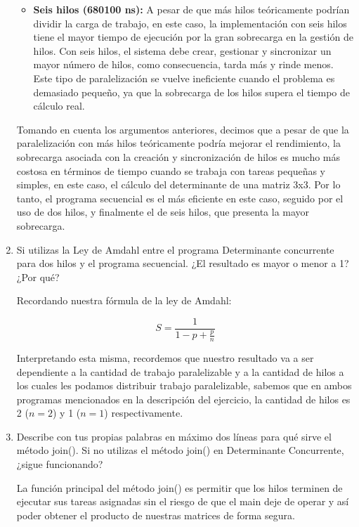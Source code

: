 \begin{enumerate}
\begin{itemize}
        \item \textbf{Seis hilos (680100 ns):} A pesar de que más hilos teóricamente podrían dividir la carga de trabajo, en este caso, la implementación con seis           hilos tiene el mayor tiempo de ejecución por la gran sobrecarga en la gestión de hilos. Con seis hilos, el sistema debe crear, gestionar y sincronizar un           mayor número de hilos, como consecuencia, tarda más y rinde menos. Este tipo de paralelización se vuelve ineficiente cuando el problema es demasiado                pequeño, ya que la sobrecarga de los hilos supera el tiempo de cálculo real.
\end{itemize}

Tomando en cuenta los argumentos anteriores, decimos que a pesar de que la paralelización con más hilos teóricamente podría mejorar el rendimiento, la sobrecarga asociada con la creación y sincronización de hilos es mucho más costosa en términos de tiempo cuando se trabaja con tareas pequeñas y simples, en este caso, el cálculo del determinante de una matriz 3x3. Por lo tanto, el programa secuencial es el más eficiente en este caso, seguido por el uso de dos hilos, y finalmente el de seis hilos, que presenta la mayor sobrecarga.


    \hfill    
    
    \item Si utilizas la Ley de Amdahl entre el programa Determinante concurrente para dos hilos y el programa secuencial. ¿El resultado es mayor o menor a 1? ¿Por qué?

    Recordando nuestra fórmula de la ley de Amdahl:

    \[ S = \frac{1}{1-p + \frac{p}{n}}\]

    Interpretando esta misma, recordemos que nuestro resultado va a ser dependiente a la cantidad de trabajo paralelizable y a la cantidad de hilos a los cuales les podamos distribuir trabajo paralelizable, sabemos que en ambos programas mencionados en la descripción del ejercicio, la cantidad de hilos es 2 ($n=2$) y 1 ($n=1$) respectivamente.

    \hfill    
    
    \item Describe con tus propias palabras en máximo dos líneas para qué sirve el método join(). Si no utilizas el método join() en Determinante Concurrente, ¿sigue funcionando?

    La función principal del método join() es permitir que los hilos terminen de ejecutar sus tareas asignadas sin el riesgo de que el main deje de operar y así poder obtener el producto de nuestras matrices de forma segura.
    

\end{enumerate}
